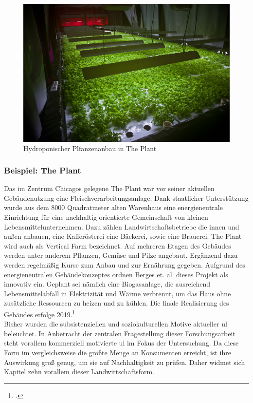 \documentclass{scrartcl}
\begin{document}
\begin{figure}[htbp]
    \centering
    \includegraphics[width=14cm]{image_folder/the_plant_2.jpg}
    \caption{Hydroponischer Plfanzenanbau in The Plant}
\end{figure} 

\subsubsection*{Beispiel: The Plant}
Das im Zentrum Chicagos gelegene The Plant war vor seiner aktuellen Gebäudenutzung eine Fleischverarbeitungsanlage. Dank staatlicher Unterstützung wurde aus dem 8000 Quadratmeter alten Warenhaus eine energieneutrale Einrichtung für eine nachhaltig orientierte Gemeinschaft von kleinen Lebensmittelunternehmen. Dazu zählen Landwirtschaftsbetriebe die innen und außen anbauen, eine Kafferösterei eine Bäckerei, sowie eine Brauerei. The Plant wird auch als Vertical Farm bezeichnet. Auf mehreren Etagen des Gebäudes werden unter anderem Pflanzen, Gemüse und Pilze angebaut. Ergänzend dazu werden regelmäßig Kurse zum Anbau und zur Ernährung gegeben. Aufgrund des energieneutralen Gebäudekonzeptes ordnen Berges et. al. dieses Projekt als innovativ ein. Geplant sei nämlich eine Biogasanlage, die ausreichend Lebensmittelabfall in Elektrizität und Wärme verbrennt, um das Haus ohne zusätzliche Ressourcen zu heizen und zu kühlen. Die finale Realisierung des Gebäudes erfolge 2019.\footcites[Vgl.][S.18]{Al-Kodmany2018TheCity}{TheLLC}
\\
Bisher wurden die subsistenziellen und soziokulturellen Motive aktueller \acs{ul} beleuchtet. In Anbetracht der zentralen Fragestellung dieser Forschungsarbeit steht vorallem kommerziell motivierte \acs{ul} im Fokus der Untersuchung. Da diese Form im vergleichsweise die größte Menge an Konsumenten erreicht, ist ihre Auswirkung groß genug, um sie auf Nachhaltigkeit zu prüfen. Daher widmet sich Kapitel zehn vorallem dieser Landwirtschaftsform.
\end{document}
